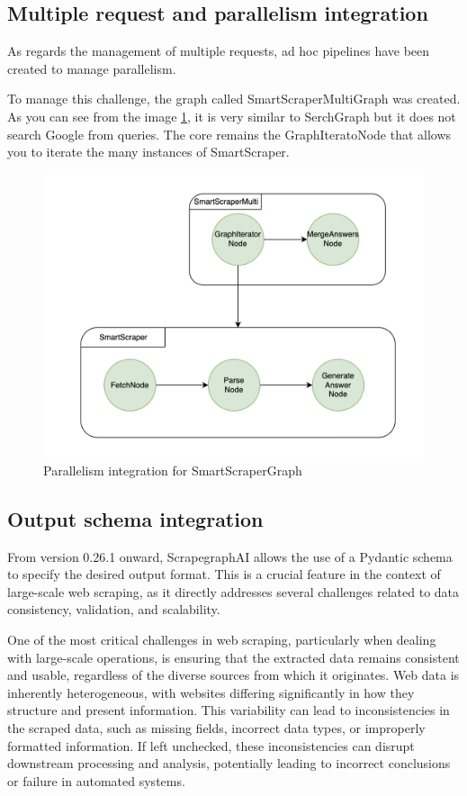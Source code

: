 \subsection{Multiple request and parallelism integration}
As regards the management of multiple requests, ad hoc pipelines have been created to manage parallelism.

To manage this challenge, the graph called SmartScraperMultiGraph was created.
As you can see from the image \ref{fig:multi}, it is very similar to SerchGraph but it does not search Google from queries.
The core remains the GraphIteratoNode that allows you to iterate the many instances of SmartScraper.
\begin{figure}[h!]
    \centering
    \includegraphics[width=0.75\linewidth]{Assets/multi_graph.png}
    \caption{Parallelism integration for SmartScraperGraph}
    \label{fig:multi}
\end{figure}


\subsection{Output schema integration}
From version 0.26.1 onward, ScrapegraphAI allows the use of a Pydantic schema to specify the desired output format. This is a crucial feature in the context of large-scale web scraping, as it directly addresses several challenges related to data consistency, validation, and scalability.

One of the most critical challenges in web scraping, particularly when dealing with large-scale operations, is ensuring that the extracted data remains consistent and usable, regardless of the diverse sources from which it originates. Web data is inherently heterogeneous, with websites differing significantly in how they structure and present information. This variability can lead to inconsistencies in the scraped data, such as missing fields, incorrect data types, or improperly formatted information. If left unchecked, these inconsistencies can disrupt downstream processing and analysis, potentially leading to incorrect conclusions or failure in automated systems.

